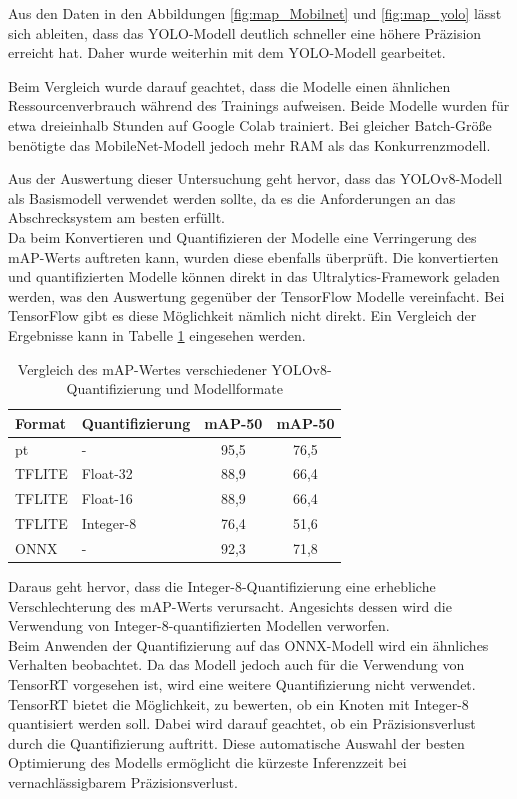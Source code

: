 Aus den Daten in den Abbildungen \ref{fig:map_Mobilnet} und \ref{fig:map_yolo} lässt sich ableiten, dass das YOLO-Modell deutlich schneller eine höhere Präzision erreicht hat. Daher wurde weiterhin mit dem \ac{YOLO}-Modell gearbeitet.

Beim Vergleich wurde darauf geachtet, dass die Modelle einen ähnlichen Ressourcenverbrauch während des Trainings aufweisen. Beide Modelle wurden für etwa dreieinhalb Stunden auf Google Colab trainiert. Bei gleicher Batch-Größe benötigte das MobileNet-Modell jedoch mehr RAM als das Konkurrenzmodell.

Aus der Auswertung dieser Untersuchung geht hervor, dass das YOLOv8-Modell als Basismodell verwendet werden sollte, da es die Anforderungen an das Abschrecksystem am besten erfüllt.
\\
Da beim Konvertieren und Quantifizieren der Modelle eine Verringerung des \ac{mAP}-Werts auftreten kann, wurden diese ebenfalls überprüft. Die konvertierten und quantifizierten Modelle können direkt in das Ultralytics-Framework geladen werden, was den Auswertung gegenüber der TensorFlow Modelle vereinfacht. Bei TensorFlow gibt es diese Möglichkeit nämlich nicht direkt. Ein Vergleich der Ergebnisse kann in Tabelle \ref{tab:map_yolo} eingesehen werden.

\begin{table}[h]
    \centering
    \begin{tabular}{llcc}
        \textbf{Format} & \textbf{Quantifizierung} & \textbf{\ac{mAP}-50} & \textbf{\ac{mAP}-50}\\
        \hline
        pt & - & 95,5 & 76,5\\
        TFLITE & Float-32 & 88,9 & 66,4 \\
        TFLITE & Float-16 & 88,9 & 66,4\\
        TFLITE & Integer-8 & 76,4 & 51,6\\
        ONNX & - & 92,3 & 71,8\\
    \end{tabular}
    \caption{Vergleich des \ac{mAP}-Wertes verschiedener YOLOv8-Quantifizierung und Modellformate}
    \label{tab:map_yolo}
\end{table}

Daraus geht hervor, dass die Integer-8-Quantifizierung eine erhebliche Verschlechterung des \ac{mAP}-Werts verursacht. Angesichts dessen wird die Verwendung von Integer-8-quantifizierten Modellen verworfen.
\\
Beim Anwenden der Quantifizierung auf das ONNX-Modell wird ein ähnliches Verhalten beobachtet. Da das Modell jedoch auch für die Verwendung von TensorRT vorgesehen ist, wird eine weitere Quantifizierung nicht verwendet. TensorRT bietet die Möglichkeit, zu bewerten, ob ein Knoten mit Integer-8 quantisiert werden soll. Dabei wird darauf geachtet, ob ein Präzisionsverlust durch die Quantifizierung auftritt. Diese automatische Auswahl der besten Optimierung des Modells ermöglicht die kürzeste Inferenzzeit bei vernachlässigbarem Präzisionsverlust.


